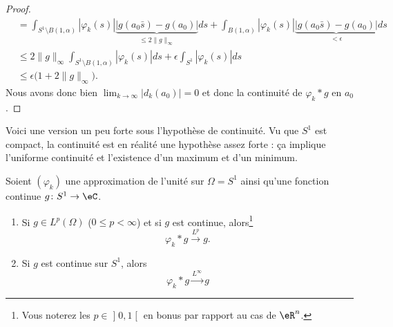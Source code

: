 \begin{proof}
\begin{subequations}
\begin{align}
			             & =\int_{S^1\setminus B(1,\alpha)}| \varphi_k(s) |\underbrace{\big| g(a_0\bar s)-g(a_0) \big|}_{\leq 2\| g \|_{\infty}}ds+\int_{B(1,\alpha)}| \varphi_k(s) |\underbrace{\big| g(a_0\bar s)-g(a_0) \big|}_{<\epsilon}ds \\
			             & \leq 2\| g \|_{\infty}\int_{S^1\setminus B(1,\alpha)}| \varphi_k(s) |ds+\epsilon\int_{S^1}| \varphi_k(s) |ds                                                                                                         \\
			             & \leq \epsilon\big( 1+2\| g \|_{\infty} \big).
		\end{align}
	\end{subequations}
	Nous avons donc bien \( \lim_{k\to \infty} | d_k(a_0) |=0\) et donc la continuité de \( \varphi_k*g\) en \( a_0\).

\end{proof}

Voici une version un peu forte sous l'hypothèse de continuité. Vu que \( S^1\) est compact, la continuité est en réalité une hypothèse assez forte : ça implique l'uniforme continuité et l'existence d'un maximum et d'un minimum.
\begin{proposition}
	Soient \( (\varphi_k)\) une approximation de l'unité sur \( \Omega=S^1\) ainsi qu'une fonction continue \( g\colon S^1\to \eC\).
	\begin{enumerate}
		\item       \label{ITEMooPHBJooOHDVoW}
		      Si \( g\in L^p(\Omega)\) (\( 0\leq p<\infty\)) et si \( g\) est continue, alors\footnote{Vous noterez les \( p\in \mathopen] 0 , 1 \mathclose[\) en bonus par rapport au cas de \( \eR^n\).}
		      \begin{equation}
			      \varphi_k*g\stackrel{L^p}{\to}g.
		      \end{equation}
		\item       \label{ITEMooLOSVooDtaugF}
		      Si \( g\) est continue sur \( S^1\), alors
		      \begin{equation}
			      \varphi_k*g\stackrel{L^{\infty}}{\to}g
		      \end{equation}
	\end{enumerate}
\end{proposition}

